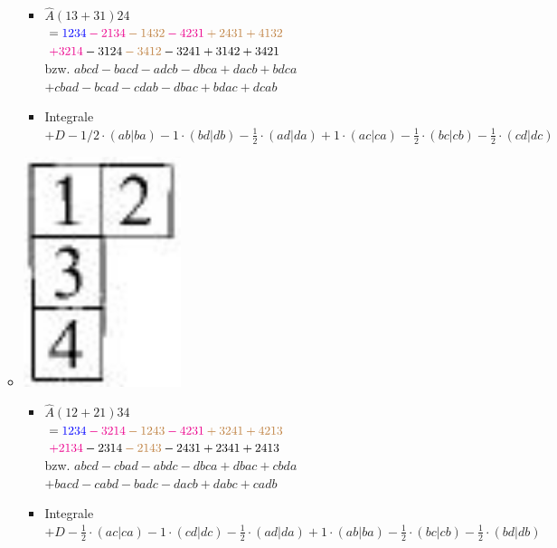 \documentclass[12pt,a4paper]{article}
\newcommand{\h}[2]{\color{#1} #2 \color{black} }
\newcommand{\equalInM}[1]{\h{blue}{#1}} %
\newcommand{\equalInTableau}[1]{\h{magenta}{#1}} %
\newcommand{\equalAntiSym}[1]{\h{brown}{#1}} %
\begin{document}
\begin{itemize}
\begin{itemize}
\begin{itemize}
\item $\hat{A} \left(13+31
 \right)24 $\\ 
 $ = \equalInM{1234} \equalInTableau{- 2134} \equalAntiSym{- 1432} \equalInTableau{- 4231} \equalAntiSym{+ 2431} \equalAntiSym{ + 4132}
 $\\
 $ \equalInTableau{+ 3214 } - 3124 \equalAntiSym{- 3412} - 3241 + 3142 + 3421
  $ \\
  bzw. $abcd - bacd - adcb - dbca + dacb + bdca$\\
  $+cbad - bcad - cdab - dbac + bdac + dcab$
  \item Integrale \\
  $+ D - 1/2 \cdot (ab|ba) - 1 \cdot (bd|db) - \frac{1}{2} \cdot (ad|da) + 1 \cdot (ac|ca) - \frac{1}{2} \cdot (bc|cb) - \frac{1}{2} \cdot (cd|dc) $
\end{itemize}
\item \includegraphics[scale=0.2]{build/young-21hoch2-12.png}
\begin{itemize}
\item $\hat{A} \left(12+21
 \right) 34$ \\ 
 $= \equalInM{1234} \equalInTableau{- 3214} \equalAntiSym{- 1243} \equalInTableau{- 4231} \equalAntiSym{+ 3241} \equalAntiSym{+ 4213}
 $\\
 $ \equalInTableau{+ 2134} - 2314 \equalAntiSym{- 2143} - 2431 + 2341 + 2413
 $ \\
 bzw. $abcd - cbad - abdc - dbca + dbac + cbda$\\$
+bacd - cabd - badc - dacb + dabc + cadb$
\item Integrale \\
$+ D - \frac{1}{2} \cdot (ac|ca) - 1 \cdot (cd|dc) - \frac{1}{2} \cdot (ad|da) + 1 \cdot (ab|ba) - \frac{1}{2} \cdot (bc|cb) - \frac{1}{2} \cdot (bd|db) $ 
\end{itemize}

\end{itemize}
\end{itemize}
\end{document}
